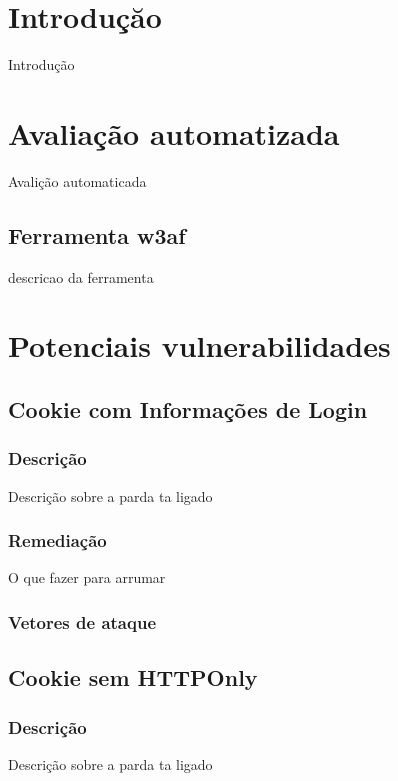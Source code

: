 \documentclass{ufscThesis}
\newcommand{\+}{\discretionary{\mbox{${\bm\cdot}\mkern-1mu$}}{}{}}
\renewcommand\+{\discretionary{}{}{}}
\begin{document}
\capa  

\sumario

\chapter{Introduçăo}
Introdução

\chapter{Avaliação automatizada}
Avalição automaticada

\section{Ferramenta w3af}
descricao da ferramenta

\chapter{Potenciais vulnerabilidades}

\section{Cookie com Informações de Login}

\subsection{Descrição}

Descrição sobre a parda ta ligado

\subsection{Remediação}

O que fazer para arrumar

\subsection{Vetores de ataque}

\section{Cookie sem HTTPOnly}

\subsection{Descrição}

Descrição sobre a parda ta ligado
\end{document}
